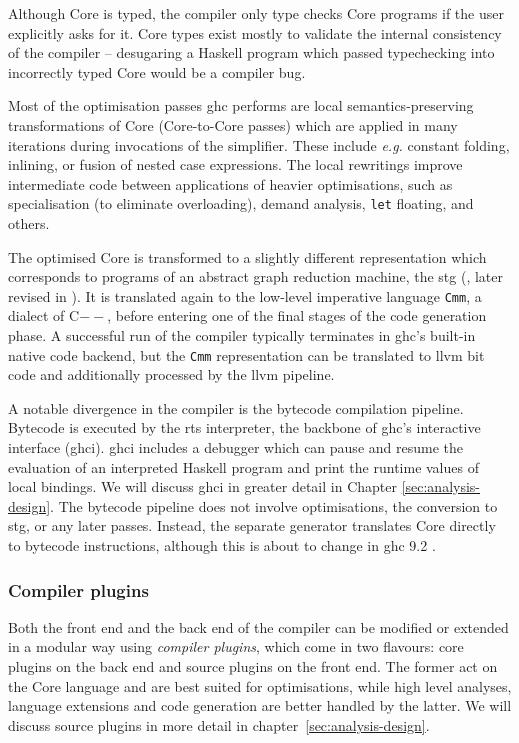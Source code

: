 \documentclass[thesis=B,english]{FITthesis}[2019/12/23]
\newcommand{\eg}{\emph{e.g.}\xspace}
\newcommand{\hsCode}[1]{\texttt{#1}}
\begin{document}
Although Core is typed, the compiler only type checks Core programs if the user
explicitly asks for it. Core types exist mostly to validate the internal
consistency of the compiler -- desugaring a Haskell program which passed
typechecking into incorrectly typed Core would be a compiler bug.

Most of the optimisation passes \acrshort{ghc} performs are local
semantics-pre\-serv\-ing transformations of Core (Core-to-Core passes) which
are applied in many iterations during invocations of the
simplifier\cite{cmtary-core2core}. These include \eg constant folding,
inlining, or fusion of nested case expressions. The local rewritings improve
intermediate code between applications of heavier optimisations, such as
specialisation (to eliminate overloading), demand analysis, \hsCode{let}
floating, and others.

The optimised Core is transformed to a slightly different representation which
corresponds to programs of an abstract graph reduction machine, the
\acrfull{stg} (\cite{stg-classic}, later revised in \cite{stg2}). It is
translated again to the low-level imperative language \texttt{Cmm}, a dialect
of C$--$, before entering one of the final stages of the code generation phase.
A successful run of the compiler typically terminates in \acrshort{ghc}'s
built-in native code back\-end, but the \texttt{Cmm} representation can be
translated to \acrshort{llvm} bit code and additionally processed by the
\acrshort{llvm} pipeline.

A notable divergence in the compiler is the bytecode compilation pipeline.
Bytecode is executed by the \acrshort{rts} interpreter, the backbone of
\acrshort{ghc}'s interactive interface (\acrshort{ghci}). \acrshort{ghci}
includes a debugger which can pause and resume the evaluation of an interpreted
Haskell program and print the runtime values of local bindings. We will discuss
\acrshort{ghci} in greater detail in Chapter \ref{sec:analysis-design}. The
bytecode pipeline does not involve optimisations, the conversion to
\acrshort{stg}, or any later passes. Instead, the separate generator translates
Core directly to bytecode instructions, although this is about to change in
\acrshort{ghc} 9.2 \cite{mr-ghci-stg-unboxed}.

\subsubsection*{Compiler plugins}
Both the front end and the back end of the compiler can be modified or extended
in a modular way using \textit{compiler plugins}, which come in two flavours:
core plugins on the back end and source plugins on the front
end\cite{ghc-source-plugins}. The former act on the Core language and are best
suited for optimisations, while high level analyses, language extensions and
code generation are better handled by the latter. We will discuss source
plugins in more detail in chapter~\ref{sec:analysis-design}.
\end{document}
